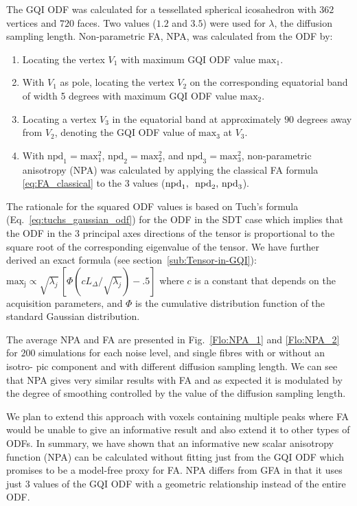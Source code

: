 \documentclass{bioinfo}
\begin{document}
The GQI ODF was calculated for a tessellated spherical icosahedron
with $362$ vertices and $720$ faces. Two values ($1.2$ and $3.5$)
were used for $\lambda$, the diffusion sampling length. Non-parametric
FA, NPA, was calculated from the ODF by: 
\begin{enumerate}
\item Locating the vertex $V_{1}$ with maximum GQI ODF value $\mathrm{max}_{1}$.
\item With $V_{1}$ as pole, locating the vertex $V_{2}$ on the corresponding
equatorial band of width 5 degrees with maximum GQI ODF value
$\textrm{max}_{2}$.
\item Locating a vertex $V_{3}$ in the equatorial band at approximately
$90$ degrees away from $V_{2}$, denoting the GQI ODF value of $\textrm{max}_{3}$
at $V_{3}$. 
\item With $\textrm{npd}_{1}=\textrm{max}_{1}^{2}$, $\textrm{npd}_{2}=\textrm{max}_{2}^{2}$,
and $\textrm{npd}_{3}=\textrm{max}_{3}^{2}$, non-parametric anisotropy
(NPA) was calculated by applying the classical FA formula \ref{eq:FA_classical}
to the 3 values ($\textrm{npd}_{1},\textrm{\,\ npd}_{2},\,\textrm{npd}_{3}$). 
\end{enumerate}
The rationale for the squared ODF values is based on Tuch's formula
(Eq.~\ref{eq:tuchs_gaussian_odf}) for the ODF in the SDT case which
implies that the ODF in the $3$ principal axes directions of the
tensor is proportional to the square root of the corresponding eigenvalue
of the tensor. We have further derived an exact formula (see section~\ref{sub:Tensor-in-GQI}):
$\mathrm{max_{j}}\propto\sqrt{\lambda_{j}}\,[\Phi(cL_{\Delta}/\sqrt{\lambda_{j}})-.5]$
where $c$ is a constant that depends on the acquisition parameters,
and $\Phi$ is the cumulative distribution function of the standard
Gaussian distribution. 

The average NPA and FA are presented in Fig.~\ref{Flo:NPA_1} and
\ref{Flo:NPA_2} for $200$ simulations for each noise level, and
single fibres with or without an isotro- pic component and with different
diffusion sampling length. We can see that NPA gives very similar
results with FA and as expected it is modulated by the degree of smoothing
controlled by the value of the diffusion sampling length. 

We plan to extend this approach with voxels containing multiple peaks
where FA would be unable to give an informative result and also extend
it to other types of ODFs. In summary, we have shown that an informative
new scalar anisotropy function (NPA) can be calculated without fitting
just from the GQI ODF which promises to be a model-free proxy for
FA. NPA differs from GFA \citep{Tuch2004} in that it uses just $3$
values of the GQI ODF with a geometric relationship instead of the
entire ODF. 
\end{document}
